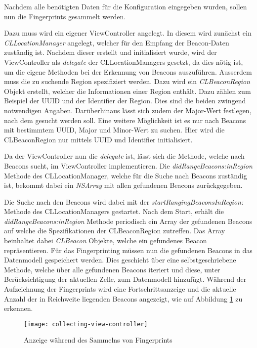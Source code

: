 Nachdem alle benötigten Daten für die Konfiguration eingegeben wurden, sollen nun die Fingerprints gesammelt werden.

Dazu muss wird ein eigener ViewController angelegt. In diesem wird zunächst ein \emph{CLLocationManager} angelegt, welcher für den Empfang der Beacon-Daten zuständig ist. Nachdem dieser erstellt und initialisiert wurde, wird der ViewController als \emph{delegate} der CLLocationManagers gesetzt, da dies nötig ist, um die eigene Methoden bei der Erkennung von Beacons auszuführen. Ausserdem muss die zu suchende Region spezifiziert werden. Dazu wird ein \emph{CLBeaconRegion} Objekt erstellt, welcher die Informationen einer Region enthält. Dazu zählen zum Beispiel der UUID und der Identifier der Region. Dies sind die beiden zwingend notwendigen Angaben. Darüberhinaus lässt sich zudem der Major-Wert festlegen, nach dem gesucht werden soll. Eine weitere Möglichkeit ist es nur nach Beacons mit bestimmtem UUID, Major und Minor-Wert zu suchen.
Hier wird die CLBeaconRegion nur mittels UUID und Identifier initialisiert.

Da der ViewController nun die \emph{delegate} ist, lässt sich die Methode, welche nach Beacons sucht, im ViewController implementieren. Die \emph{didRangeBeacons:inRegion} Methode des CLLocationManager, welche für die Suche nach Beacons zuständig ist, bekommt dabei ein \emph{NSArray} mit allen gefundenen Beacons zurückgegeben. 

Die Suche nach den Beacons wird dabei mit der \emph{startRangingBeaconsInRegion:} Methode des CLLocationManagers gestartet.
Nach dem Start, erhält die \emph{didRangeBeacons:inRegion} Methode periodisch ein Array der gefundenen Beacons auf welche die Spezifikationen der CLBeaconRegion zutreffen. 
Das Array beinhaltet dabei \emph{CLBeacon} Objekte, welche ein gefundenes Beacon repräsentieren.
Für das Fingerprinting müssen nun die gefundenen Beacons in das Datenmodell gespeichert werden. Dies geschieht über eine selbstgeschriebene Methode, welche über alle gefundenen Beacons iteriert und diese, unter Berücksichtigung der aktuellen Zelle, zum Datenmodell hinzufügt.
Während der Aufzeichnung der Fingerprints wird eine Fortschrittsanzeige und die aktuelle Anzahl der in Reichweite liegenden Beacons angezeigt, wie auf Abbildung \ref{collecting-view-controller} zu erkennen.

\begin{figure}[htb!]
		\centering
	\texttt{[image: collecting-view-controller]}
	\caption{Anzeige während des Sammelns von Fingerprints}
	\label{collecting-view-controller}
\end{figure}

